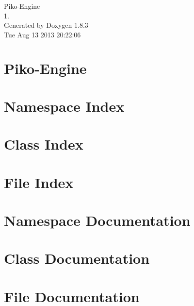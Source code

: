 \documentclass{book}
\begin{document}
\hypersetup{pageanchor=false,citecolor=blue}
\begin{titlepage}
\vspace*{7cm}
\begin{center}
{\Large Piko-\/\-Engine \\[1ex]\large 1. }\\
\vspace*{1cm}
{\large Generated by Doxygen 1.8.3}\\
\vspace*{0.5cm}
{\small Tue Aug 13 2013 20:22:06}\\
\end{center}
\end{titlepage}
\clearemptydoublepage
{}
\tableofcontents
\clearemptydoublepage
{}
\hypersetup{pageanchor=true,citecolor=blue}
\chapter{Piko-\/\-Engine}
\label{md_README}
\hypertarget{md_README}{}

\chapter{Namespace Index}

\chapter{Class Index}

\chapter{File Index}

\chapter{Namespace Documentation}

\chapter{Class Documentation}




\chapter{File Documentation}








\printindex
\end{document}
